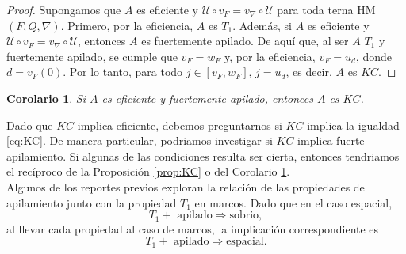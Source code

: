 \documentclass[12pt]{article}
\newtheorem{cor}[thm]{Corolario}
\begin{document}
\begin{proof}

Supongamos que $A$ es eficiente y $\mathcal{U}\circ v_F=v_\nabla\circ \mathcal{U}$ para toda terna HM $(F, Q, \nabla)$. Primero, por la eficiencia, 
$A$ es $T_1$. Además, si $A$ es eficiente y $\mathcal{U}\circ v_F=v_\nabla\circ \mathcal{U}$, entonces $A$ es fuertemente apilado. De aquí que, al ser $A$ $T_1$ y fuertemente apilado, 
se cumple que $v_F=w_F$ y, por la eficiencia, $v_F=u_d$, donde $d=v_F(0)$. Por lo tanto, para todo $j\in [v_F, w_F]$, $j=u_d$, es decir, $A$ es $KC$.
\end{proof}

\begin{cor}\label{FapiladoKC}
    Si $A$ es eficiente y fuertemente apilado, entonces $A$ es $KC$.
\end{cor}

Dado que $KC$ implica eficiente, debemos preguntarnos si $KC$ implica la igualdad \eqref{eq:KC}. De manera particular, podriamos investigar si $KC$ implica fuerte apilamiento. Si algunas de las condiciones resulta ser cierta, entonces tendriamos el recíproco de la Proposición \ref{prop:KC} o del Corolario \ref{FapiladoKC}.\\

Algunos de los reportes previos exploran la relación de las propiedades de apilamiento junto con la propiedad $T_1$ en marcos. Dado que en el caso espacial, 
\[
T_1+\text{ apilado}\Longrightarrow \text{sobrio},
\]
al llevar cada propiedad al caso de marcos, la implicación correspondiente es
\[
T_1+\text{ apilado}\Longrightarrow \text{espacial}.
\]
\end{document}
